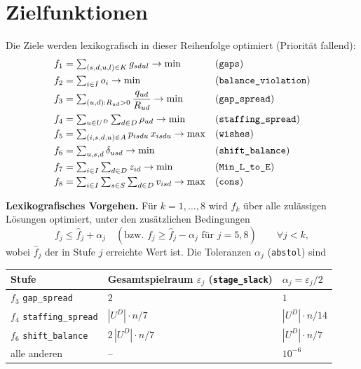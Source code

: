 \documentclass[11pt]{combiArticle}
\newcommand{\code}[1]{\texttt{#1}}
\begin{document}
\section{Zielfunktionen}

Die Ziele werden lexikografisch in dieser Reihenfolge optimiert (Priorität fallend):
\begin{align}
  f_1 &= \textstyle\sum_{(s,d,u,l) \in K} g_{sdul} \to \min && \text{(\code{gaps})} \label{obj:gaps}\\
  f_2 &= \textstyle\sum_{i \in I} o_i \to \min && \text{(\code{balance\_violation})} \label{obj:balance}\\
  f_3 &= \textstyle\sum_{(u,d) : R_{ud} > 0} \dfrac{q_{ud}}{R_{ud}} \to \min && \text{(\code{gap\_spread})} \label{obj:gapspread}\\
  f_4 &= \textstyle\sum_{u \in U^{D}} \sum_{d \in D} \rho_{ud} \to \min && \text{(\code{staffing\_spread})} \label{obj:staffingspread}\\
  f_5 &= \textstyle\sum_{(i,s,d,u) \in A} p_{isdu}\, x_{isdu} \to \max && \text{(\code{wishes})} \label{obj:wishes}\\
  f_6 &= \textstyle\sum_{u,s,d} \delta_{usd} \to \min && \text{(\code{shift\_balance})} \label{obj:shiftbalance}\\
  f_7 &= \textstyle\sum_{i \in I} \sum_{d \in D} z_{id} \to \min && \text{(\code{Min\_L\_to\_E})} \label{obj:ltoe}\\
  f_8 &= \textstyle\sum_{i \in I} \sum_{s \in S} \sum_{d \in D} v_{isd} \to \max && \text{(\code{cons})} \label{obj:cons}
\end{align}

\textbf{Lexikografisches Vorgehen.}
Für $k = 1,\dots,8$ wird $f_k$ über alle zulässigen Lösungen optimiert, unter den zusätzlichen Bedingungen
\begin{equation}
  f_j \le \hat f_j + \alpha_j \quad (\text{bzw. } f_j \ge \hat f_j - \alpha_j \text{ für } j = 5, 8)
  \qquad \forall j < k, \label{obj:lex}
\end{equation}
wobei $\hat f_j$ der in Stufe $j$ erreichte Wert ist. Die Toleranzen $\alpha_j$ (\code{abstol}) sind
\begin{center}
\small
\begin{tabular}{l l l}
\hline
Stufe & Gesamtspielraum $\varepsilon_j$ (\code{stage\_slack}) & $\alpha_j = \varepsilon_j/2$ \\
\hline
$f_3$ \code{gap\_spread} & $2$ & $1$ \\
$f_4$ \code{staffing\_spread} & $|U^{D}| \cdot n / 7$ & $|U^{D}| \cdot n / 14$ \\
$f_6$ \code{shift\_balance} & $2\,|U^{D}| \cdot n / 7$ & $|U^{D}| \cdot n / 7$ \\
alle anderen & -- & $10^{-6}$ \\
\hline
\end{tabular}
\end{center}
\end{document}
